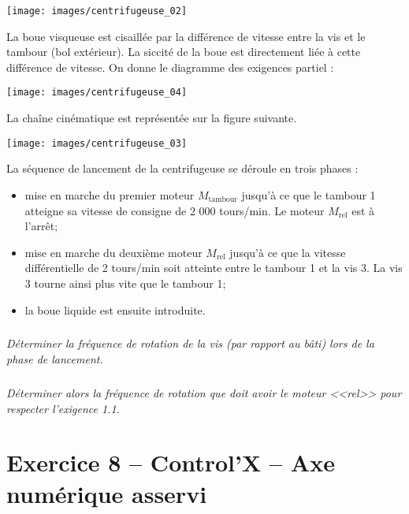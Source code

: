 \documentclass[10pt,fleqn]{article} %
\begin{document}
\begin{multicols}{2}
\begin{multicols}{2}
\normalsize

\begin{center}
\texttt{[image: images/centrifugeuse\_02]}
\end{center}

La boue visqueuse est cisaillée par la différence de vitesse entre la vis et le tambour (bol extérieur).
La siccité de la boue est directement liée à cette différence de vitesse. On donne le diagramme des exigences partiel :

\begin{center}
\texttt{[image: images/centrifugeuse\_04]}
\end{center}


La chaîne cinématique est représentée sur la figure
suivante.

\begin{center}
\texttt{[image: images/centrifugeuse\_03]}
\end{center}






La séquence de lancement de la centrifugeuse se déroule en trois phases :
\begin{itemize}
\item mise en marche du premier moteur $M_{\text{tambour}}$ jusqu’à ce que le tambour 1 atteigne sa vitesse
de consigne de 2 000 tours/min. Le moteur $M_{\text{rel}}$ est à l’arrêt;
\item mise en marche du deuxième moteur $M_{\text{rel}}$ jusqu’à ce que la vitesse différentielle de
2 tours/min soit atteinte entre le tambour 1 et la vis 3. La vis 3 tourne ainsi plus vite que le
tambour 1;
\item la boue liquide est ensuite introduite.
\end{itemize}



\subparagraph{}
\textit{Déterminer la fréquence de rotation de la vis (par rapport au bâti) lors de la phase de lancement.}

\subparagraph{}
\textit{Déterminer alors la fréquence de rotation que doit avoir le moteur <<rel>> pour respecter l'exigence 1.1.}




\section*{Exercice 8 -- Control'X -- Axe numérique asservi}
\setcounter{exo}{0}


\end{multicols}
\end{multicols}
\end{document}
